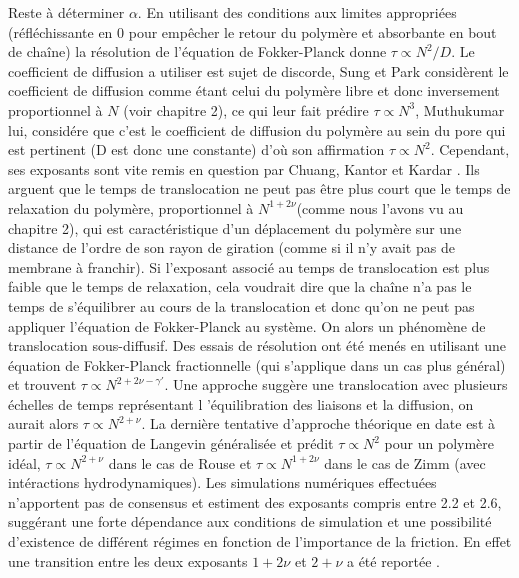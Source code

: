  Reste à déterminer $\alpha$. En utilisant des conditions aux limites appropriées (réfléchissante en 0 pour empêcher le retour du polymère et absorbante en bout de chaîne) la résolution de l'équation de Fokker-Planck donne $\tau \propto N^{2}/D$. Le coefficient de diffusion a utiliser est sujet de discorde, Sung et Park \cite{Sung1996} considèrent le coefficient de diffusion comme étant celui du polymère libre et donc inversement proportionnel à $N$ (voir chapitre 2), ce qui leur fait prédire $\tau \propto N^{3}$, Muthukumar \cite{Muthukumar1999} lui, considére que c'est le coefficient de diffusion du polymère au sein du pore qui est pertinent (D est donc une constante) d'où son affirmation $\tau \propto N^{2}$. Cependant, ses exposants sont vite remis en question par Chuang, Kantor et Kardar \cite{Chuang2001}. Ils arguent que le temps de translocation ne peut pas être plus court que le temps de relaxation du polymère, proportionnel à $N^{1+2\nu}$(comme nous l'avons vu au chapitre 2), qui est caractéristique d'un déplacement du polymère sur une distance de l'ordre de son rayon de giration (comme si il n'y avait pas de membrane à franchir). Si l'exposant associé au temps de translocation est plus faible que le temps de relaxation, cela voudrait dire que la chaîne n'a pas le temps de s'équilibrer au cours de la translocation et donc qu'on ne peut pas appliquer l'équation de Fokker-Planck au système. On alors un phénomène de translocation sous-diffusif. Des essais de résolution ont été menés en utilisant une équation de Fokker-Planck fractionnelle \cite{Metzler2003} (qui s'applique dans un cas plus général) et trouvent $\tau \propto N^{2+2\nu-\gamma'}$. Une approche suggère une translocation avec plusieurs échelles de temps représentant l 'équilibration des liaisons et la diffusion, on aurait alors $\tau \propto N^{2+\nu}$. La dernière tentative d'approche théorique en date est à partir de l'équation de Langevin généralisée \cite{Panja2010} et prédit $\tau \propto N^2$ pour un polymère idéal, $\tau \propto N^{2+\nu}$ dans le cas de Rouse et $\tau \propto N^{1+2\nu}$ dans le cas de Zimm (avec intéractions hydrodynamiques). Les simulations numériques effectuées n'apportent pas de consensus et estiment des exposants compris entre 2.2 et 2.6, suggérant une forte dépendance aux conditions de simulation et une possibilité d'existence de différent régimes en fonction de l'importance de la friction. En effet une transition entre les deux exposants $1+2\nu$ et $2+\nu$ a été reportée \cite{Panja22010}.\\

